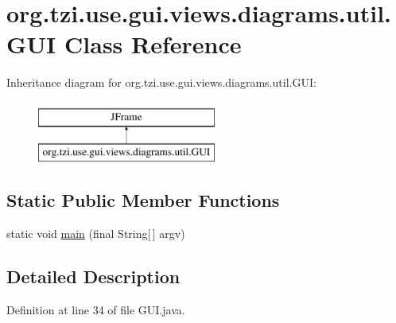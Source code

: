 \hypertarget{classorg_1_1tzi_1_1use_1_1gui_1_1views_1_1diagrams_1_1util_1_1_g_u_i}{\section{org.\-tzi.\-use.\-gui.\-views.\-diagrams.\-util.\-G\-U\-I Class Reference}
\label{classorg_1_1tzi_1_1use_1_1gui_1_1views_1_1diagrams_1_1util_1_1_g_u_i}
}
Inheritance diagram for org.\-tzi.\-use.\-gui.\-views.\-diagrams.\-util.\-G\-U\-I\-:\begin{figure}[H]
\begin{center}
\leavevmode
\includegraphics[height=2.000000cm]{classorg_1_1tzi_1_1use_1_1gui_1_1views_1_1diagrams_1_1util_1_1_g_u_i}
\end{center}
\end{figure}
\subsection*{Static Public Member Functions}
\begin{DoxyCompactItemize}
\item 
static void \hyperlink{classorg_1_1tzi_1_1use_1_1gui_1_1views_1_1diagrams_1_1util_1_1_g_u_i_a0b3abed82b9e72083ffd49e288280622}{main} (final String\mbox{[}$\,$\mbox{]} argv)
\end{DoxyCompactItemize}


\subsection{Detailed Description}


Definition at line 34 of file G\-U\-I.\-java.



